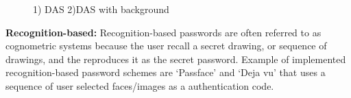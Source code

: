         \begin{figure}[H]
          \centering
          \caption{1) DAS 2)DAS with background}
        \end{figure}

      {\bf Recognition-based:} Recognition-based passwords are often referred to as cognometric systems \cite{DeAngeli} because the user recall a secret drawing, or sequence of drawings, and the reproduces it as the secret password. Example of implemented recognition-based password schemes are `Passface' and `Deja vu' that uses a sequence of user selected faces/images as a authentication code.

